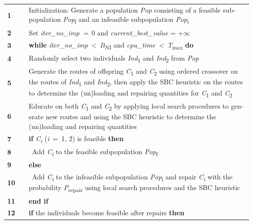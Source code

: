 \documentclass[
  english,
]{article}
\newcounter{none} %
\begin{document}
\begin{otherlanguage}{english}
\protect{}\label{t0100}
{\def\LTcaptype{none} %
\begin{longtable}[]{@{}lll@{}}
\toprule\noalign{}
\multicolumn{3}{@{}l@{}}{%
\textbf{Algorithm 1: HGSADC-SBC}} \\
\midrule\noalign{}
\endhead
\bottomrule\noalign{}
\endlastfoot
\textbf{1} & & Initialization: Generate a population \emph{Pop} consisting of a feasible
subpopulation \emph{Pop}\textsubscript{f} and an infeasible subpopulation
\emph{Pop}\textsubscript{i} \\
\textbf{2} & & Set \emph{iter\_no\_imp~=}~0 and \emph{current\_best\_value} = +\ensuremath{\infty} \\
\textbf{3} & & \textbf{while} \emph{iter\_no\_imp}~\textless~\emph{It}\textsubscript{NI} and
\emph{cpu\_time~\textless~T}\textsubscript{max} \textbf{do} \\
\textbf{4} & & Randomly select two individuals \emph{Ind}\textsubscript{1} and
\emph{Ind}\textsubscript{2} from \emph{Pop} \\
\textbf{5} & & Generate the routes of offspring \emph{C}\textsubscript{1} and
\emph{C}\textsubscript{2} using ordered crossover on the routes of \emph{Ind}\textsubscript{1} and
\emph{Ind}\textsubscript{2}, then apply the SBC heuristic on the routes to determine the (un)loading
and repairing quantities for \emph{C}\textsubscript{1} and \emph{C}\textsubscript{2} \\
\textbf{6} & & Educate on both \emph{C}\textsubscript{1} and \emph{C}\textsubscript{2} by applying
local search procedures to generate new routes and using the SBC heuristic to determine the
(un)loading and repairing quantities \\
\textbf{7} & & \textbf{if} \emph{C\textsubscript{i}} (\emph{i}~=~1, 2) is feasible \textbf{then} \\
\textbf{8} & & ~Add \emph{C\textsubscript{i}} to the feasible subpopulation
\emph{Pop}\textsubscript{f} \\
\textbf{9} & & \textbf{else} \\
\textbf{10} & & ~Add \emph{C\textsubscript{i}} to the infeasible subpopulation
\emph{Pop}\textsubscript{i} and repair \emph{C\textsubscript{i}} with the probability
\emph{P}\textsubscript{repair} using local search procedures and the SBC heuristic \\
\textbf{11} & & \textbf{end if} \\
\textbf{12} & & \textbf{if} the individuals become feasible after repairs \textbf{then} \\

\end{longtable}}
\end{otherlanguage}
\end{document}
